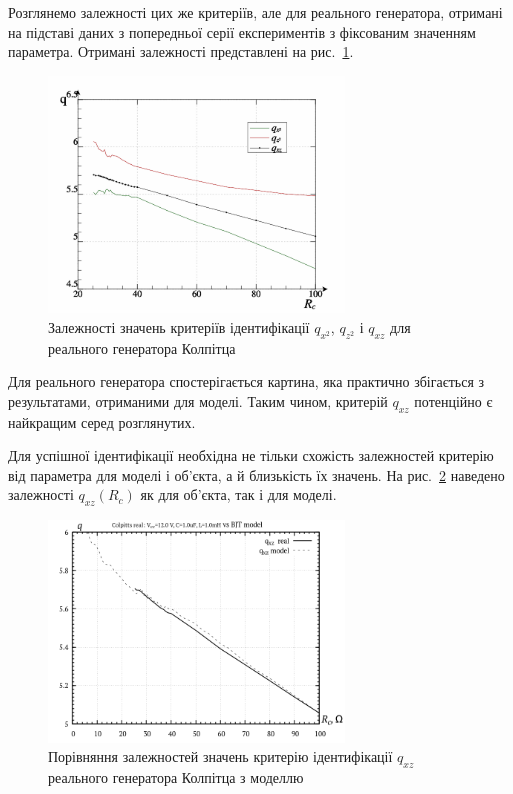 Розглянемо залежності цих же критеріїв, але для реального
генератора, отримані на підставі даних з попередньої серії
експериментів з фіксованим значенням параметра. Отримані
залежності представлені на рис.~\ref{atu:f:colp_read_q-p_Rc_q-p_Rc_q}.


\begin{figure}[htb!]
\centerline{\includegraphics[width=0.7\textwidth]{p/colp_read_q-p_Rc_q.png} }
\caption{Залежності значень критеріїв ідентифікації $q_{x^2}$, $q_{z^2}$ і $q_{xz} $ для реального генератора Колпітца}
\label{atu:f:colp_read_q-p_Rc_q-p_Rc_q}
\end{figure}

Для реального генератора спостерігається картина, яка практично
збігається з результатами, отриманими для моделі. Таким чином,
критерій $q_{xz}$ потенційно є найкращим серед розглянутих.

Для успішної ідентифікації необхідна не тільки схожість
залежностей критерію від параметра для моделі і об'єкта, а й
близькість їх значень. На рис.~\ref{atu:f:colp_q_cml} наведено залежності
$q_{xz}(R_c)$ як для об'єкта, так і для моделі.

\begin{figure}[htb!]
\centerline{\includegraphics[width=0.7\textwidth]{p/colp_q_cml.png} }
\caption{Порівняння залежностей значень критерію ідентифікації $ q_{xz} $ реального генератора Колпітца з моделлю}
\label{atu:f:colp_q_cml}
\end{figure}

